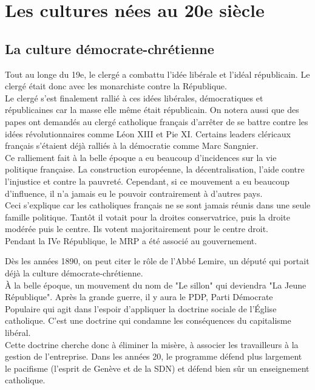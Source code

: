 \documentclass[12pt, a4paper, openany]{book}
\begin{document}
\section{Les cultures nées au 20e siècle}

\subsection{La culture démocrate-chrétienne}

Tout au longe du 19e, le clergé a combattu l'idée libérale et l'idéal républicain. Le clergé était donc avec les monarchiste contre la République. \\
Le clergé s'est finalement rallié à ces idées libérales, démocratiques et républicaines car la masse elle même était républicain. On notera aussi que des papes ont demandés au clergé catholique français d'arrêter de se battre contre les idées révolutionnaires comme Léon XIII et Pie XI. Certains leaders cléricaux français s'étaient déjà ralliés à la démocratie comme Marc Sangnier. \\
Ce ralliement fait à la belle époque a eu beaucoup d'incidences sur la vie politique française. La construction européenne, la décentralisation, l'aide contre l'injustice et contre la pauvreté. Cependant, si ce mouvement a eu beaucoup d'influence, il n'a jamais eu le pouvoir contrairement à d'autres pays. \\
Ceci s'explique car les catholiques français ne se sont jamais réunis dans une seule famille politique. Tantôt il votait pour la droites conservatrice, puis la droite modérée puis le centre. Ils votent majoritairement pour le centre droit. \\
Pendant la IVe République, le MRP a été associé au gouvernement. 


Dès les années 1890, on peut citer le rôle de l'Abbé Lemire, un député qui portait déjà la culture démocrate-chrétienne. \\
À la belle époque, un mouvement du nom de "Le sillon" qui deviendra "La Jeune République". Après la grande guerre, il y aura le PDP, Parti Démocrate Populaire qui agit dans l'espoir d'appliquer la doctrine sociale de l'Église catholique. C'est une doctrine qui condamne les conséquences du capitalisme libéral. \\
Cette doctrine cherche donc à éliminer la misère, à associer les travailleurs à la gestion de l'entreprise. Dans les années 20, le programme défend plus largement le pacifisme (l'esprit de Genève et de la SDN) et défend bien sûr un enseignement catholique. 
\end{document}
